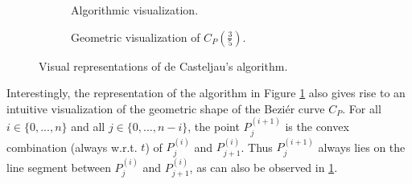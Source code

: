 \documentclass[a4paper, 11pt]{report}
\theoremstyle{definition}
\begin{document}
\begin{figure}[!h]
	\centering
	\begin{subfigure}{0.49\textwidth}
		\caption{Algorithmic visualization.}
	\end{subfigure}
	\hfill
	\begin{subfigure}{0.49\textwidth}
		
		\caption{Geometric visualization of $C_P(\frac{3}{5})$.}
	\end{subfigure}
	\caption{Visual representations of de Casteljau's algorithm.}
	\label{fig:decasteljautriangle}
\end{figure}

Interestingly, the representation of the algorithm in Figure \ref{fig:decasteljautriangle} also gives rise to an intuitive visualization of the geometric shape of the Beziér curve $C_P$. For all $i \in \{0, ..., n\}$ and all $j \in \{0, ..., n-i\}$, the point $P^{(i+1)}_j$ is the convex combination (always w.r.t. $t$) of $P^{(i)}_j$ and $P^{(i)}_{j+1}$. Thus $P^{(i+1)}_j$ always lies on the line segment between $P^{(i)}_j$ and $P^{(i)}_{j+1}$, as can also be observed in \ref{fig:decasteljautriangle}.
\end{document}
